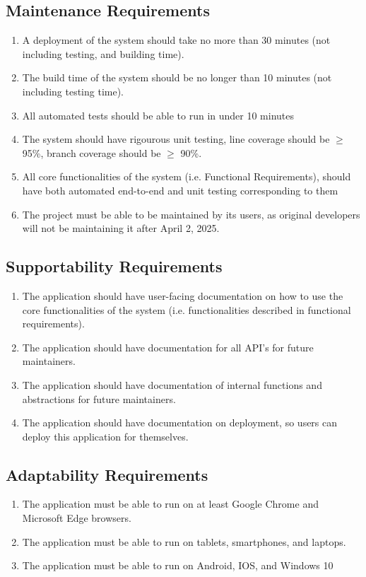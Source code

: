 \documentclass[12pt]{article}
\begin{document}
\subsection{Maintenance Requirements}
\begin{enumerate} [{MS-MTN}1.]
  \item A deployment of the system should take no more than 30 minutes (not
    including testing, and building time).
  \item The build time of the system should be no longer than 10 minutes (not
    including testing time).
  \item All automated tests should be able to run in under 10 minutes
  \item The system should have rigourous unit testing, line coverage should be
    $\ge$ 95\%, branch coverage should be $\ge$ 90\%.
  \item All core functionalities of the system (i.e. Functional Requirements),
    should have both automated end-to-end and unit testing corresponding to them
  \item The project must be able to be maintained by its users, as original
    developers will not be maintaining it after April 2, 2025.
\end{enumerate}
\subsection{Supportability Requirements}
\begin{enumerate} [{MS-SUP}1.]
  \item The application should have user-facing documentation on how to use the
    core functionalities of the system (i.e. functionalities described in
    functional requirements).
  \item The application should have documentation for all API's for future
    maintainers.
  \item The application should have documentation of internal functions and
    abstractions for future maintainers.
  \item The application should have documentation on deployment, so users can
    deploy this application for themselves.
\end{enumerate}
\subsection{Adaptability Requirements}
\begin{enumerate} [{MS-ADP}1.]
  \item The application must be able to run on at least Google Chrome and
    Microsoft Edge browsers.
  \item The application must be able to run on tablets, smartphones, and
    laptops.
  \item The application must be able to run on Android, IOS, and Windows 10
\end{enumerate}
\end{document}
